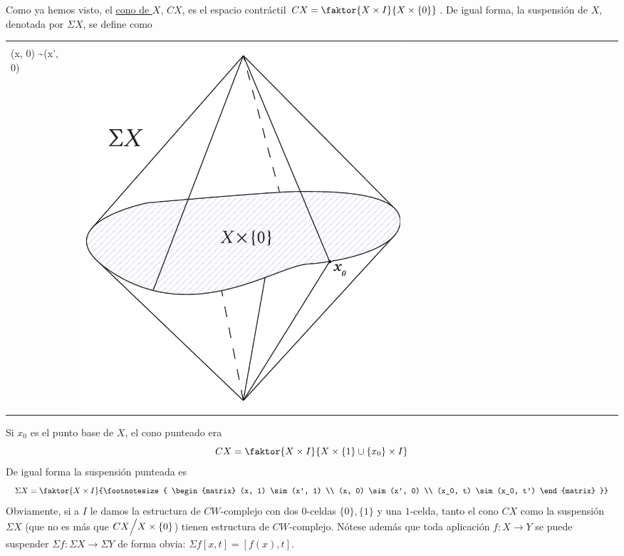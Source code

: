 Como ya hemos visto, el \hyperlink{ecom:cono}{cono de $X$}, $CX$, es el espacio contráctil $CX = \faktor{X \times I }{X \times \{ 0 \}}$. De igual forma, la suspensión de $X$, denotada por $\Sigma X$, se define como \par 
\begin{tabular}{ll}
\begin{minipage}{0.5\textwidth}
\[ \Sigma X =  \faktor{X \times I}
{ \footnotesize{\begin{matrix}
(x, 1) \sim (x', 1) \\
(x, 0) \sim (x', 0)
\end{matrix}}} \] 
\end{minipage}
&
\begin{minipage}{0.5\textwidth}
\includegraphics[width=0.6\textwidth]{images/suspensionalt.pdf}
\end{minipage}
\end{tabular}
Si $x_0$ es el punto base de $X$, el cono punteado era
\[ CX = \faktor{X \times I}{X \times \{ 1 \}  \cup \{ x_0 \} \times I}\]
De igual forma la suspensión punteada es 
\[ \Sigma X = \faktor{ X \times I }
{\footnotesize{ \begin{matrix}
(x, 1) \sim (x', 1) \\ 
(x, 0) \sim (x', 0) \\ 
(x_0, t) \sim (x_0, t')
\end{matrix} }} \]
Obviamente, si a $I$ le damos la estructura de $CW$-complejo con dos $0$-celdas $\{0\}, \{1\}$ y una $1$-celda, tanto el cono $CX$ como la suspensión $\Sigma X$ (que no es más que $CX \Bign/ X \times \{ 0 \}$) tienen estructura de $CW$-complejo. Nótese además que toda aplicación $f : X \rightarrow Y$ se puede suspender $\Sigma f : \Sigma X \rightarrow \Sigma Y$ de forma obvia:
$\Sigma f [x, t] = [f(x), t]$. \par

